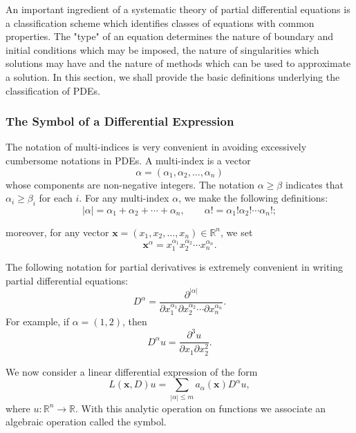 An important ingredient of a systematic theory of partial differential equations is a classification scheme which identifies classes of equations with common properties. The "type" of an equation determines the nature of boundary and initial conditions which may be imposed, the nature of singularities which solutions may have and the nature of methods which can be used to approximate a solution. In this section, we shall provide the basic definitions underlying the classification of PDEs.

\subsubsection{The Symbol of a Differential Expression}\label{subsec:differential-symbol}

The notation of multi-indices is very convenient in avoiding excessively cumbersome notations in PDEs. A multi-index is a vector
\[
\alpha=(\alpha_1,\alpha_2,\ldots,\alpha_n)
\]
whose components are non-negative integers. The notation $\alpha\geq\beta$ indicates that $\alpha_i\geq\beta_i$ for each $i$. For any multi-index $\alpha$, we make the following definitions:
\begin{equation}\label{eq:multi-index-length-factorial}
|\alpha|=\alpha_1+\alpha_2+\cdots+\alpha_n,\qquad \alpha!=\alpha_1!\alpha_2!\cdots\alpha_n!;
\end{equation}


moreover, for any vector $\bm{x}=(x_1,x_2,\ldots,x_n)\in\mathbb{R}^n$, we set
\begin{equation}\label{eq:multi-index-monomial}
\bm{x}^{\alpha}=x_1^{\alpha_1}x_2^{\alpha_2}\cdots x_n^{\alpha_n}.
\end{equation}


The following notation for partial derivatives is extremely convenient in writing partial differential equations:
\begin{equation}\label{eq:multi-index-derivative}
D^{\alpha}=\dfrac{\partial^{|\alpha|}}{\partial x_1^{\alpha_1}\partial x_2^{\alpha_2}\cdots\partial x_n^{\alpha_n}}.
\end{equation}
For example, if $\alpha=(1,2)$, then
\begin{equation}\label{eq:multi-index-example}
D^{\alpha}u=\dfrac{\partial^3u}{\partial x_1\partial x_2^2}.
\end{equation}


We now consider a linear differential expression of the form
\begin{equation}\label{eq:general-linear-differential-expression}
L(\bm{x},D)u=\sum_{|\alpha|\leq m}a_{\alpha}(\bm{x})D^{\alpha}u,
\end{equation}
where $u:\mathbb{R}^n\to\mathbb{R}$. With this analytic operation on functions we associate an algebraic operation called the symbol.

